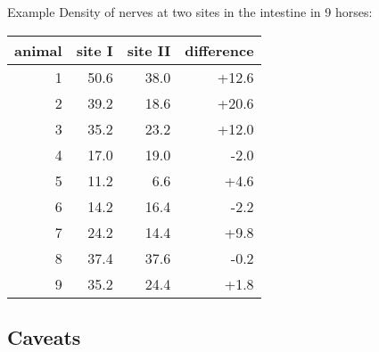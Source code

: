 \begin{frame}{Example}
    Density of nerves at two sites in the intestine in 9 horses:
    \begin{center}
\begin{tabular}{rrrr}
  \hline
 animal & site I & site II & difference \\ 
  \hline
  1 &  50.6 & 38.0 & +12.6 \\ 
  2 &  39.2 & 18.6 & +20.6 \\ 
  3 &  35.2 & 23.2 & +12.0 \\ 
  4 &  17.0 & 19.0 & -2.0 \\ 
  5 &  11.2 & 6.6 & +4.6 \\ 
  6 &  14.2 & 16.4 & -2.2 \\ 
  7 &  24.2 & 14.4 & +9.8 \\ 
  8 &  37.4 & 37.6 & -0.2 \\ 
  9 &  35.2 & 24.4 & +1.8 \\ 
   \hline
\end{tabular}
    \end{center}

\end{frame}

\subsection{Caveats}


